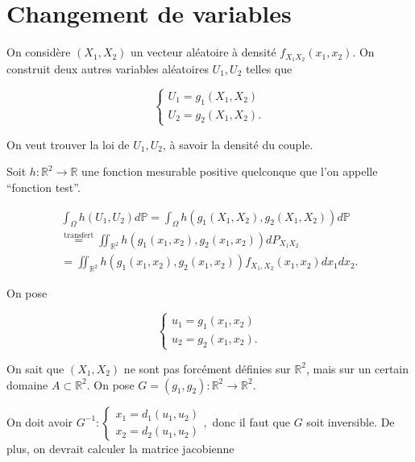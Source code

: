 \documentclass[french]{book}
\theoremstyle{definition}
\theoremstyle{remark}
\begin{document}





\section{Changement de variables}

On considère \((X_1, X_2)\) un vecteur aléatoire à densité \(f _{X_1 X_2}(x_1, x_2)\). On construit deux autres variables aléatoires \(U_1, U_2\) telles que

\[\begin{cases}
U_1 = g_1(X_1, X_2) \\
U_2 = g_2(X_1, X_2).
\end{cases}\]


On veut trouver la loi de \(U_1, U_2\), à savoir la densité du couple.

Soit \(h : \mathbb{R}^2 \to \mathbb{R}\) une fonction mesurable positive quelconque que l'on appelle ``fonction test''.

\begin{gather}
  \int_{\Omega} h(U_1, U_2) d \mathbb{P} = \int_{\Omega} h(g_1(X_1, X_2), g_2(X_1, X_2)) d \mathbb{P} \\
  \stackrel{\text{transfert}}{=} \iint_{\mathbb{R}^2} h (g_1(x_1, x_2), g_2(x_1, x_2)) d P _{X_1 X_2}\\
  = \iint_{\mathbb{R}^2} h(g_1(x_1, x_2), g_2(x_1, x_2)) f _{X_1, X_2} (x_1, x_2) d x_1 d x_2. \label{chva}
\end{gather}

On pose

\[\begin{cases}
u_1 = g_1 (x_1, x_2) \\
u_2 = g_2 (x_1, x_2).
\end{cases}\]

On sait que \((X_1, X_2)\) ne sont pas forcément définies sur \(\mathbb{R}^2\), mais sur un certain domaine \(A \subset \mathbb{R}^2\). On pose \(G = (g_1, g_2) : \mathbb{R}^2 \to \mathbb{R}^2\).

On doit avoir \(G ^{-1}  : \begin{cases}
  x_1 = d_1(u_1, u_2) \\
  x_2 = d_2(u_1, u_2)
\end{cases},\) donc il faut que \(G\) soit inversible. De plus, on devrait calculer la matrice jacobienne
\end{document}
